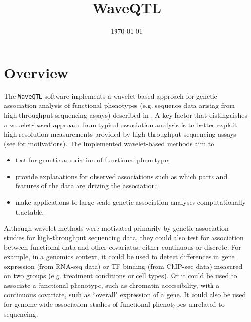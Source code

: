 \documentclass[11pt]{article}
\date{\today}
\begin{document}
\title{WaveQTL}

\maketitle


\section{Overview}
The {\tt WaveQTL} software implements a wavelet-based approach for genetic association analysis of functional phenotypes (e.g. sequence data arising from high-throughput sequencing assays) described in \cite{Shim2014}. A key factor that distinguishes a wavelet-based approach from typical association analysis is to better exploit high-resolution measurements provided by high-throughput sequencing assays (see \cite{Shim2014} for motivations). The implemented wavelet-based methods aim to  
\begin{itemize}
\item test for genetic association of functional phenotype;
\item provide explanations for observed associations such as which parts and features of the data are driving the association;
\item make applications to large-scale genetic association analyses computationally tractable.
\end{itemize}
Although wavelet methods were motivated primarily by genetic association studies for high-throughput sequencing data, they could also test for association between functional data and
other covariates, either continuous or discrete. For example, in a genomics context, it could be used to detect differences in gene expression (from RNA-seq data) or TF binding (from ChIP-seq data) measured on two groups (e.g. treatment conditions or cell types). Or it could be used to associate a functional phenotype, such as chromatin accessibility, with a continuous covariate, such as ``overall" expression of a gene. It could also be used for genome-wide association studies of functional phenotypes unrelated to sequencing.
\end{document}
